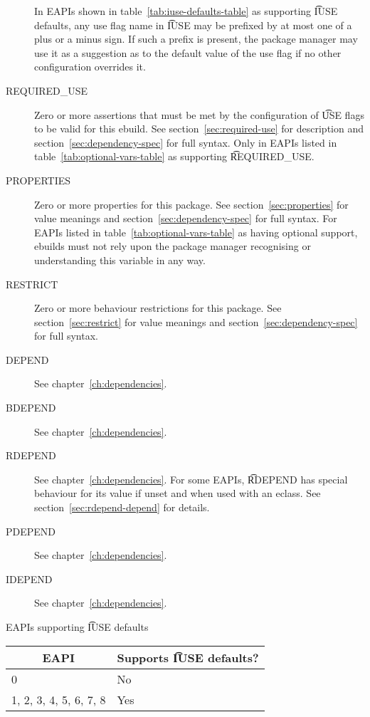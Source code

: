 \begin{description}
     In EAPIs shown in table~\ref{tab:iuse-defaults-table} as supporting
    \t{IUSE} defaults, any use flag name in \t{IUSE} may be prefixed by at most one of a plus or a
    minus sign. If such a prefix is present, the package manager may use it as a suggestion as to
    the default value of the use flag if no other configuration overrides it.
\item[REQUIRED_USE]  Zero or more assertions that must be met by the
    configuration of \t{USE} flags to be valid for this ebuild. See section~\ref{sec:required-use}
    for description and section~\ref{sec:dependency-spec} for full syntax. Only in EAPIs listed in
    table~\ref{tab:optional-vars-table} as supporting \t{REQUIRED_USE}.
\item[PROPERTIES]  Zero or more properties for this package.
    See section~\ref{sec:properties} for value meanings and section~\ref{sec:dependency-spec} for
    full syntax. For EAPIs listed in table~\ref{tab:optional-vars-table} as having optional support,
    ebuilds must not rely upon the package manager recognising or understanding this variable in
    any way.
\item[RESTRICT] Zero or more behaviour restrictions for this package. See section~\ref{sec:restrict}
    for value meanings and section~\ref{sec:dependency-spec} for full syntax.
\item[DEPEND] See chapter~\ref{ch:dependencies}.
\item[BDEPEND] See chapter~\ref{ch:dependencies}.
\item[RDEPEND] See chapter~\ref{ch:dependencies}. For some EAPIs, \t{RDEPEND} has special behaviour
    for its value if unset and when used with an eclass. See section~\ref{sec:rdepend-depend} for
    details.
\item[PDEPEND] See chapter~\ref{ch:dependencies}.
\item[IDEPEND] See chapter~\ref{ch:dependencies}.
\end{description}

\begin{centertable}{EAPIs supporting \t{IUSE} defaults}
    \label{tab:iuse-defaults-table}
    \begin{tabular}{ll}
      \toprule
      \multicolumn{1}{c}{\textbf{EAPI}} &
      \multicolumn{1}{c}{\textbf{Supports \t{IUSE} defaults?}} \\
      \midrule
      0                      & No  \\
      1, 2, 3, 4, 5, 6, 7, 8 & Yes \\
      \bottomrule
    \end{tabular}
\end{centertable}

